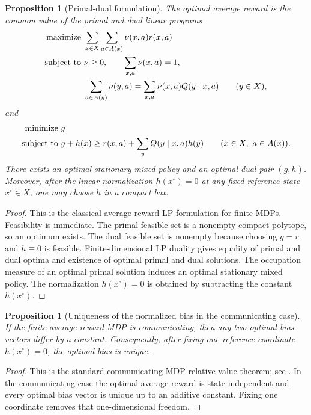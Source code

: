 \documentclass[12pt]{article}
\newtheorem{proposition}[theorem]{Proposition}
\theoremstyle{definition}
\newcommand{\1}{\mathbf{1}}
\begin{document}
\begin{proposition}[Primal-dual formulation]
\label{prop:mdp-duality}
The optimal average reward is the common value of the primal and dual linear
programs
\begin{align*}
\textnormal{maximize }&\sum_{x\in X}\sum_{a\in A(x)}\nu(x,a)r(x,a)
\\
\textnormal{subject to }&\nu\ge 0,
\qquad \sum_{x,a}\nu(x,a)=1,
\\
&\sum_{a\in A(y)}\nu(y,a)=\sum_{x,a}\nu(x,a)Q(y\mid x,a)
\qquad (y\in X),
\end{align*}
and
\begin{align*}
\textnormal{minimize }&g
\\
\textnormal{subject to }&g+h(x)\ge r(x,a)+\sum_y Q(y\mid x,a)h(y)
\qquad (x\in X,\ a\in A(x)).
\end{align*}
There exists an optimal stationary mixed policy and an optimal dual pair $(g,h)$.
Moreover, after the linear normalization $h(x^\circ)=0$ at any fixed reference
state $x^\circ\in X$, one may choose $h$ in a compact box.
\end{proposition}

\begin{proof}
This is the classical average-reward LP formulation for finite MDPs. Feasibility is
immediate. The primal feasible set is a nonempty compact polytope, so an optimum
exists. The dual feasible set is nonempty because choosing $g=\overline r$ and
$h\equiv 0$ is feasible. Finite-dimensional LP duality gives equality of primal
and dual
optima and existence of optimal primal and dual solutions. The occupation measure
of an optimal primal solution induces an optimal stationary mixed policy. The
normalization $h(x^\circ)=0$ is obtained by subtracting the constant $h(x^\circ)$.
\end{proof}

\begin{proposition}[Uniqueness of the normalized bias in the communicating case]
\label{prop:bias-unique}
If the finite average-reward MDP is communicating, then any two optimal bias
vectors differ by a constant. Consequently, after fixing one reference coordinate
$h(x^\circ)=0$, the optimal bias is unique.
\end{proposition}

\begin{proof}
This is the standard communicating-MDP relative-value theorem; see
\cite[Chapter~8]{Puterman1994}. In the communicating case the optimal average
reward is state-independent and every optimal bias vector is unique up to an
additive constant. Fixing one coordinate removes that one-dimensional freedom.
\end{proof}
\end{document}
